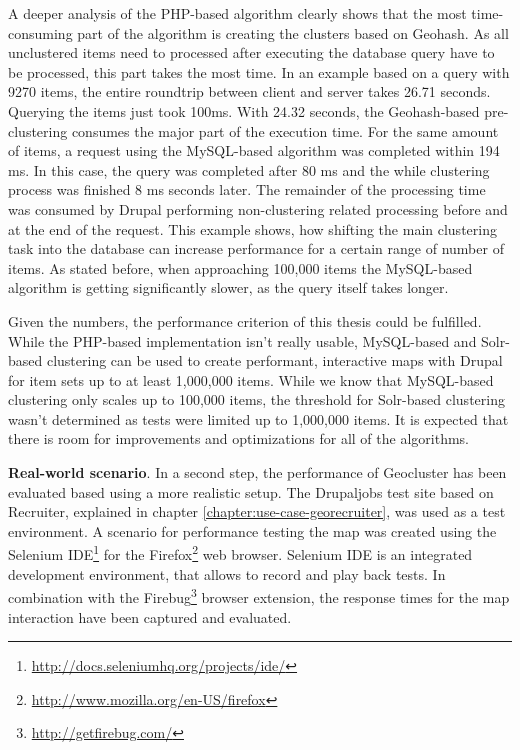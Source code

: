A deeper analysis of the PHP-based algorithm clearly shows that the most time-consuming part of the algorithm is creating the clusters based on Geohash. As all unclustered items need to processed after executing the database query have to be processed, this part takes the most time. In an example based on a query with 9270 items, the entire roundtrip between client and server takes 26.71 seconds. Querying the items just took 100ms. With 24.32 seconds, the Geohash-based pre-clustering consumes the major part of the execution time. For the same amount of items, a request using the MySQL-based algorithm was completed within 194 ms. In this case, the query was completed after 80 ms and the while clustering process was finished 8 ms seconds later. The remainder of the processing time was consumed by Drupal performing non-clustering related processing before and at the end of the request. This example shows, how shifting the main clustering task into the database can increase performance for a certain range of number of items. As stated before, when approaching 100,000 items the MySQL-based algorithm is getting significantly slower, as the query itself takes longer.

Given the numbers, the performance criterion of this thesis could be fulfilled. While the PHP-based implementation isn't really usable, MySQL-based and Solr-based clustering can be used to create performant, interactive maps with Drupal for item sets up to at least 1,000,000 items. While we know that MySQL-based clustering only scales up to 100,000 items, the threshold for Solr-based clustering wasn't determined as tests were limited up to 1,000,000 items. It is expected that there is room for improvements and optimizations for all of the algorithms.



\textbf{Real-world scenario}. In a second step, the performance of Geocluster has been evaluated based using a more realistic setup. The Drupaljobs test site based on Recruiter, explained in chapter \ref{chapter:use-case-georecruiter}, was used as a test environment. A scenario for performance testing the map was created using the Selenium IDE\footnote{\url{http://docs.seleniumhq.org/projects/ide/}} for the Firefox\footnote{\url{http://www.mozilla.org/en-US/firefox}} web browser. Selenium IDE is an integrated development environment, that allows to record and play back tests. In combination with the Firebug\footnote{\url{http://getfirebug.com/}} browser extension, the response times for the map interaction have been captured and evaluated.

